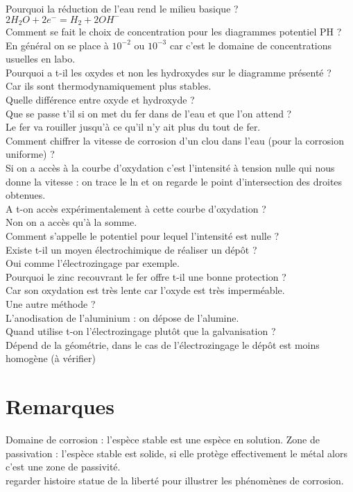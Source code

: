 \documentclass[12pt,prb,aps,epsf]{article}
\begin{document}
Pourquoi la réduction de l'eau rend le milieu basique ?\\
$2H_2O + 2e^- = H_2 + 2OH^-$\\

Comment se fait le choix de concentration pour les diagrammes potentiel PH ?\\
En général on se place à $10^{-2}$ ou $10^{-3}$ car c'est le domaine de concentrations usuelles en labo. \\

Pourquoi a t-il les oxydes et non les hydroxydes sur le diagramme présenté ?\\
Car ils sont thermodynamiquement plus stables.\\

Quelle différence entre oxyde et hydroxyde ?\\

Que se passe t'il si on met du fer dans de l'eau et que l'on attend ?\\
Le fer va rouiller jusqu'à ce qu'il n'y ait plus du tout de fer.\\

Comment chiffrer la vitesse de corrosion d'un clou dans l'eau (pour la corrosion uniforme) ?\\
Si on a accès à la courbe d'oxydation c'est l'intensité à tension nulle qui nous donne la vitesse : on trace le ln et on regarde le point d'intersection des droites obtenues.\\

A t-on accès expérimentalement à cette courbe d'oxydation ?\\
Non on a accès qu'à la somme.\\

Comment s'appelle le potentiel pour lequel l'intensité est nulle ?\\

Existe t-il un moyen électrochimique de réaliser un dépôt ?\\
Oui comme l'électrozingage par exemple.\\

Pourquoi le zinc recouvrant le fer offre t-il une bonne protection ?\\
Car son oxydation est très lente car l'oxyde est très imperméable.\\

Une autre méthode ?\\
L'anodisation de l'aluminium : on dépose de l'alumine.\\

Quand utilise t-on l'électrozingage plutôt que la galvanisation ?\\
Dépend de la géométrie, dans le cas de l'électrozingage le dépôt est moins homogène (à vérifier)\\

\section*{Remarques}
Domaine de corrosion : l'espèce stable est une espèce en solution. Zone de passivation : l'espèce stable est solide, si elle protège effectivement le métal alors c'est une zone de passivité.\\

regarder histoire statue de la liberté pour illustrer les phénomènes de corrosion.
\end{document}
